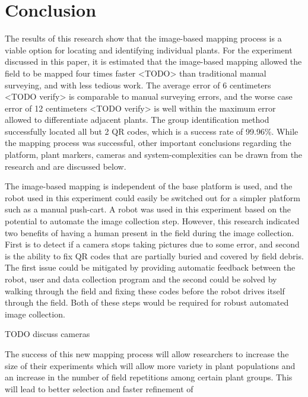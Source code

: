 
\cleardoublepage

\chapter{Conclusion}
\label{conclusion}

The results of this research show that the image-based mapping process is a viable option for locating and identifying individual plants.  For the experiment discussed in this paper, it is estimated that the image-based mapping allowed the field to be mapped four times faster <TODO> than traditional manual surveying, and with less tedious work.  The average error of 6 centimeters <TODO verify> is comparable to manual surveying errors, and the worse case error of 12 centimeters <TODO verify> is well within the maximum error allowed to differentiate adjacent plants.  The group identification method successfully located all but 2 QR codes, which is a success rate of 99.96\%.  While the mapping process was successful, other important conclusions regarding the platform, plant markers, cameras and system-complexities can be drawn from the research and are discussed below.

The image-based mapping is independent of the base platform is used, and the robot used in this experiment could easily be switched out for a simpler platform such as a manual push-cart.  A robot was used in this experiment based on the potential to automate the image collection step.  However, this research indicated two benefits of having a human present in the field during the image collection.  First is to detect if a camera stops taking pictures due to some error, and second is the ability to fix QR codes that are partially buried and covered by field debris.  The first issue could be mitigated by providing automatic feedback between the robot, user and data collection program and the second could be solved by walking through the field and fixing these codes before the robot drives itself through the field.  Both of these steps would be required for robust automated image collection.       


TODO discuss cameras 


The success of this new mapping process will allow researchers to increase the size of their experiments which will allow more variety in plant populations and an increase in the number of field repetitions among certain plant groups. This will lead to better selection and faster refinement of  

